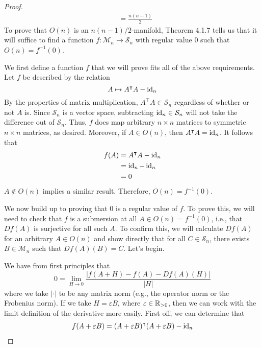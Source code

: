 \documentclass[../psets.tex]{subfiles}
\begin{document}
\begin{enumerate}[label={\textbf{4.1.\roman*.}}]
\begin{proof}
\begin{align*}
            &= \frac{n(n-1)}{2}
        \end{align*}
        To prove that $O(n)$ is an $n(n-1)/2$-manifold, Theorem 4.1.7 tells us that it will suffice to find a function $f:\mathcal{M}_n\to\mathcal{S}_n$ with regular value 0 such that $O(n)=f^{-1}(0)$.\par\medskip
        We first define a function $f$ that we will prove fits all of the above requirements. Let $f$ be described by the relation
        \begin{equation*}
            A \mapsto A^\intercal A-\operatorname{id}_n
        \end{equation*}
        By the properties of matrix multiplication, $A^\intercal A\in\mathcal{S}_n$ regardless of whether or not $A$ is. Since $\mathcal{S}_n$ is a vector space, subtracting $\operatorname{id}_n\in\mathcal{S}_n$ will not take the difference out of $\mathcal{S}_n$. Thus, $f$ does map arbitrary $n\times n$ matrices to symmetric $n\times n$ matrices, as desired. Moreover, if $A\in O(n)$, then $A^\intercal A=\operatorname{id}_n$. It follows that
        \begin{align*}
            f(A) &= A^\intercal A-\operatorname{id}_n\\
            &= \operatorname{id}_n-\operatorname{id}_n\\
            &= 0
        \end{align*}
        $A\notin O(n)$ implies a similar result. Therefore, $O(n)=f^{-1}(0)$.\par\medskip
        We now build up to proving that 0 is a regular value of $f$. To prove this, we will need to check that $f$ is a submersion at all $A\in O(n)=f^{-1}(0)$, i.e., that $Df(A)$ is surjective for all such $A$. To confirm this, we will calculate $Df(A)$ for an arbitrary $A\in O(n)$ and show directly that for all $C\in\mathcal{S}_n$, there exists $B\in\mathcal{M}_n$ such that $Df(A)(B)=C$. Let's begin.\par
        We have from first principles that
        \begin{equation*}
            0 = \lim_{H\to 0}\frac{|f(A+H)-f(A)-Df(A)(H)|}{|H|}
        \end{equation*}
        where we take $|\cdot|$ to be any matrix norm (e.g., the operator norm or the Frobenius norm). If we take $H=\varepsilon B$, where $\varepsilon\in\mathbb{R}_{>0}$, then we can work with the limit definition of the derivative more easily. First off, we can determine that
        \begin{align*}
            f(A+\varepsilon B) &= (A+\varepsilon B)^\intercal(A+\varepsilon B)-\id_n\\

\end{align*}
\end{proof}
\end{enumerate}
\end{document}
